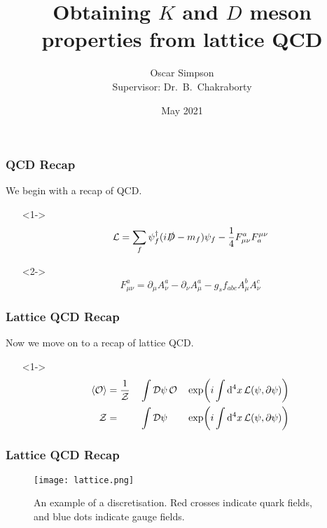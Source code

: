 \documentclass{beamer}
\title[]{Obtaining $K$ and $D$ meson properties from lattice QCD}
\author[Oscar Simpson]{Oscar Simpson \\ Supervisor: Dr.\ B.\ Chakraborty}
\date{May 2021}
\begin{document}
\frame{\titlepage}


\begin{frame}
\frametitle{QCD Recap}
We begin with a recap of QCD\cite{2010QFT, 2015Colquhoun}.
\begin{itemize}
    \item[]<1-> 
    \begin{equation*}
    \mathcal{L} = \sum_f \psi^\dagger_f (i\slashed{D}-m_f) \psi_f - \frac{1}{4}F^a_{\mu\nu} F^{\mu\nu}_a
    \end{equation*}
    
    \item[]<2->
    \begin{equation*}
    F^a_{\mu\nu} = \partial_\mu A_\nu^a - \partial_\nu A_\mu^a - g_s f_{abc} A_\mu^b A_\nu^c
    \end{equation*}
\end{itemize}
\end{frame}

\begin{frame}
\frametitle{Lattice QCD Recap}
Now we move on to a recap of lattice QCD\cite{1948Feynman, 2015Colquhoun}.
\begin{itemize}
    \item[]<1->
    \begin{alignat*}{3}
    \expval{\mathcal{O}} &= \dfrac{1}{\mathcal{Z}}&&\int\mathinner{\operatorname{\mathrm{\mathcal{D}}}\!\psi} \mathcal{O}  &&\exp(i \int \dd[4]{x} \mathcal{L}(\psi, \partial \psi)) \\
    \mathcal{Z}          &=                       &&\int\mathinner{\operatorname{\mathrm{\mathcal{D}}}\!\psi}              &&\exp(i \int \dd[4]{x} \mathcal{L}(\psi, \partial \psi))
    \end{alignat*}

\end{itemize}
    
\end{frame}

\begin{frame}
\frametitle{Lattice QCD Recap}
\begin{figure}
    \centering
    \texttt{[image: lattice.png]}
    \caption{An example of a discretisation. Red crosses indicate quark fields, and blue dots indicate gauge fields.}
\end{figure}
\end{frame}
\end{document}
